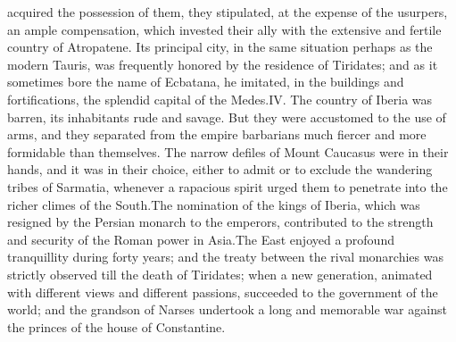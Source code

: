 acquired the possession of them, they stipulated, at the expense
of the usurpers, an ample compensation, which invested their ally
with the extensive and fertile country of Atropatene. Its
principal city, in the same situation perhaps as the modern
Tauris, was frequently honored by the residence of Tiridates; and
as it sometimes bore the name of Ecbatana, he imitated, in the
buildings and fortifications, the splendid capital of the Medes.\footnotemark[82]
IV. The country of Iberia was barren, its inhabitants rude and
savage. But they were accustomed to the use of arms, and they
separated from the empire barbarians much fiercer and more
formidable than themselves. The narrow defiles of Mount Caucasus
were in their hands, and it was in their choice, either to admit
or to exclude the wandering tribes of Sarmatia, whenever a
rapacious spirit urged them to penetrate into the richer climes
of the South.\footnotemark[83] The nomination of the kings of Iberia, which was
resigned by the Persian monarch to the emperors, contributed to
the strength and security of the Roman power in Asia.\footnotemark[84] The East
enjoyed a profound tranquillity during forty years; and the
treaty between the rival monarchies was strictly observed till
the death of Tiridates; when a new generation, animated with
different views and different passions, succeeded to the
government of the world; and the grandson of Narses undertook a
long and memorable war against the princes of the house of
Constantine.


